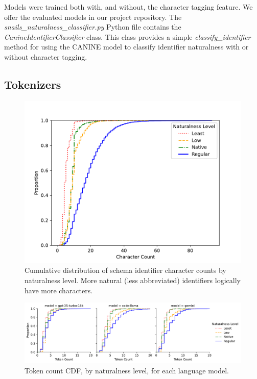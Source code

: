 Models were trained both with, and without, the character tagging feature.
We offer the evaluated models in our project repository.
The \emph{snails\_naturalness\_classifier.py} Python file contains the \emph{CanineIdentifierClassifier} class.
This class provides a simple \emph{classify\_identifier} method for using the CANINE model to classify identifier naturalness with or without character tagging.

\subsection{Tokenizers}

\begin{figure}[ht]
  \centering
  \includegraphics[width=0.5\linewidth]{figures/identifier-char-count-cdf.pdf}
  \caption{Cumulative distribution of schema identifier character counts by naturalness level. More natural (less abbreviated) identifiers logically have more characters.}
  \label{fig:charcountcdf}
\end{figure}

\begin{figure}[ht]
  \centering
  \includegraphics[width=\textwidth]{figures/identifier-token-count-cdf.pdf}
  \caption{Token count CDF, by naturalness level, for each language model.}
  \label{fig:tokencountcdf}
\end{figure}

